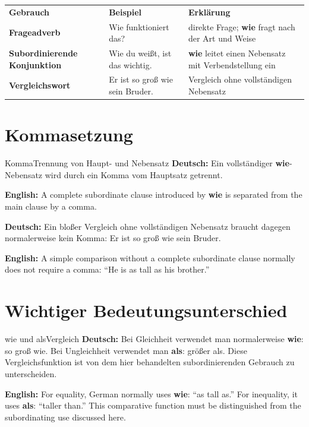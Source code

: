 \documentclass[a4paper,11pt]{article}
\newcommand{\GermanText}[1]{\textbf{Deutsch: }#1\par}
\newcommand{\EnglishText}[1]{{\small\color{SoftGray}\textbf{English: }#1\par}}
\begin{document}
\begin{longtable}{>{\bfseries}p{3.2cm}|p{5.7cm}|p{5.4cm}}
\rowcolor{HeaderBlueDark}
\color{white}\textbf{Gebrauch} &
\color{white}\textbf{Beispiel} &
\color{white}\textbf{Erklärung} \\
Frageadverb & Wie funktioniert das? & direkte Frage; \textbf{wie} fragt nach der Art und Weise \\
Subordinierende Konjunktion & Wie du weißt, ist das wichtig. & \textbf{wie} leitet einen Nebensatz mit Verbendstellung ein \\
Vergleichswort & Er ist so groß wie sein Bruder. & Vergleich ohne vollständigen Nebensatz \\
\end{longtable}

\section{Kommasetzung}

\begin{grammarentry}{Komma}{Trennung von Haupt- und Nebensatz}
\GermanText{Ein vollständiger \textbf{wie}-Nebensatz wird durch ein Komma vom Hauptsatz getrennt.}
\EnglishText{A complete subordinate clause introduced by \textbf{wie} is separated from the main clause by a comma.}

\GermanText{Ein bloßer Vergleich ohne vollständigen Nebensatz braucht dagegen normalerweise kein Komma: \glqq Er ist so groß wie sein Bruder.\grqq}
\EnglishText{A simple comparison without a complete subordinate clause normally does not require a comma: ``He is as tall as his brother.''}
\end{grammarentry}

\section{Wichtiger Bedeutungsunterschied}

\begin{grammarentry}{wie und als}{Vergleich}
\GermanText{Bei Gleichheit verwendet man normalerweise \textbf{wie}: \glqq so groß wie\grqq. Bei Ungleichheit verwendet man \textbf{als}: \glqq größer als\grqq. Diese Vergleichsfunktion ist von dem hier behandelten subordinierenden Gebrauch zu unterscheiden.}
\EnglishText{For equality, German normally uses \textbf{wie}: ``as tall as.'' For inequality, it uses \textbf{als}: ``taller than.'' This comparative function must be distinguished from the subordinating use discussed here.}
\end{grammarentry}
\end{document}
